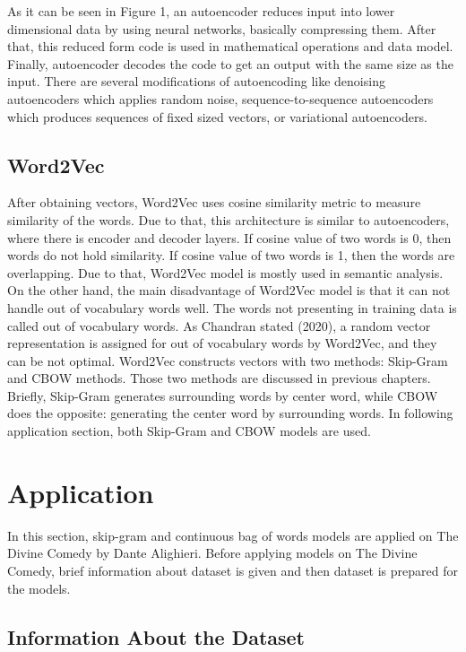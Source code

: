 \documentclass[man]{apa7}
\begin{document}
As it can be seen in Figure 1, an autoencoder reduces input into lower dimensional data by using neural networks, basically compressing them. After that, this reduced form code is used in mathematical operations and data model. Finally, autoencoder decodes the code to get an output with the same size as the input. There are several modifications of autoencoding like denoising autoencoders which applies random noise, sequence-to-sequence autoencoders which produces sequences of fixed sized vectors, or variational autoencoders.

\subsection{Word2Vec}

After obtaining vectors, Word2Vec uses cosine similarity metric to measure similarity of the words. Due to that, this architecture is similar to autoencoders, where there is encoder and decoder layers. If cosine value of two words is 0, then words do not hold similarity. If cosine value of two words  is 1, then the words are overlapping. Due to that, Word2Vec model is mostly used in semantic analysis. On the other hand, the main disadvantage of Word2Vec model is that it can not handle out of vocabulary words well. The words not presenting in training data is called out of vocabulary words.  As Chandran stated (2020), a random vector representation is assigned for out of vocabulary words by Word2Vec, and they can be not optimal. Word2Vec constructs vectors with two methods: Skip-Gram and CBOW methods. Those two methods are discussed in previous chapters. Briefly, Skip-Gram generates surrounding words by center word, while CBOW does the opposite: generating the center word by surrounding words. In following application section, both Skip-Gram and CBOW models are used.

\section{Application}

In this section, skip-gram and continuous bag of words models are applied on The Divine Comedy by Dante Alighieri. Before applying models on The Divine Comedy, brief information about dataset is given and then dataset is prepared for the models.

\subsection{Information About the Dataset}
\end{document}

